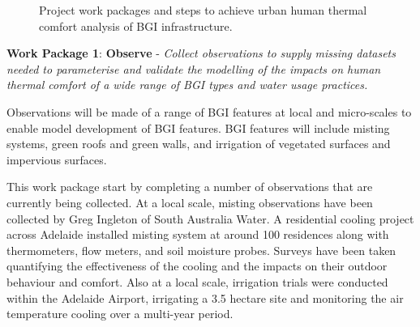 \begin{figure}[ht]
\begin{center}
\end{center}
\caption{Project work packages and steps to achieve urban human thermal comfort analysis of BGI infrastructure.}
\label{fig:overall}
\end{figure}



\textbf{Work Package 1}: \textbf{Observe} - \emph{Collect observations to supply missing datasets needed to parameterise and validate the modelling of the impacts on human thermal comfort of a wide range of BGI types and water usage practices.}

Observations will be made of a range of BGI features at local and micro-scales to enable model development of BGI features. BGI features will include misting systems, green roofs and green walls, and irrigation of vegetated surfaces and impervious surfaces. 

This work package start by completing a number of observations that are currently being collected. At a local scale, misting observations have been collected by Greg Ingleton of South Australia Water. A residential cooling project across Adelaide installed misting system at around 100 residences along with thermometers, flow meters, and soil moisture probes. Surveys have been taken quantifying the effectiveness of the cooling and the impacts on their outdoor behaviour and comfort. Also at a local scale, irrigation trials were conducted within the Adelaide Airport, irrigating a 3.5 hectare site and monitoring the air temperature cooling over a multi-year period\cite{CRCWCS2018,Ingleton2020,Qian2020}. 


